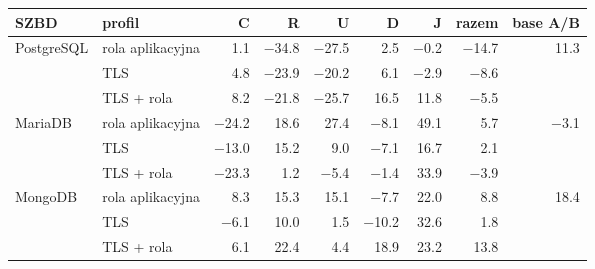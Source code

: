\begin{tabular}{llrrrrrrr}
\toprule
SZBD & profil & C & R & U & D & J & razem & base A/B \\
\midrule
PostgreSQL & rola aplikacyjna & \num[print-implicit-plus]{+1.1} & \num[print-implicit-plus]{-34.8} & \num[print-implicit-plus]{-27.5} & \num[print-implicit-plus]{+2.5} & \num[print-implicit-plus]{-0.2} & \num[print-implicit-plus]{-14.7} & \num[print-implicit-plus]{+11.3} \\
 & TLS & \num[print-implicit-plus]{+4.8} & \num[print-implicit-plus]{-23.9} & \num[print-implicit-plus]{-20.2} & \num[print-implicit-plus]{+6.1} & \num[print-implicit-plus]{-2.9} & \num[print-implicit-plus]{-8.6} & \\
 & TLS + rola & \num[print-implicit-plus]{+8.2} & \num[print-implicit-plus]{-21.8} & \num[print-implicit-plus]{-25.7} & \num[print-implicit-plus]{+16.5} & \num[print-implicit-plus]{+11.8} & \num[print-implicit-plus]{-5.5} & \\
\midrule
MariaDB & rola aplikacyjna & \num[print-implicit-plus]{-24.2} & \num[print-implicit-plus]{+18.6} & \num[print-implicit-plus]{+27.4} & \num[print-implicit-plus]{-8.1} & \num[print-implicit-plus]{+49.1} & \num[print-implicit-plus]{+5.7} & \num[print-implicit-plus]{-3.1} \\
 & TLS & \num[print-implicit-plus]{-13.0} & \num[print-implicit-plus]{+15.2} & \num[print-implicit-plus]{+9.0} & \num[print-implicit-plus]{-7.1} & \num[print-implicit-plus]{+16.7} & \num[print-implicit-plus]{+2.1} & \\
 & TLS + rola & \num[print-implicit-plus]{-23.3} & \num[print-implicit-plus]{+1.2} & \num[print-implicit-plus]{-5.4} & \num[print-implicit-plus]{-1.4} & \num[print-implicit-plus]{+33.9} & \num[print-implicit-plus]{-3.9} & \\
\midrule
MongoDB & rola aplikacyjna & \num[print-implicit-plus]{+8.3} & \num[print-implicit-plus]{+15.3} & \num[print-implicit-plus]{+15.1} & \num[print-implicit-plus]{-7.7} & \num[print-implicit-plus]{+22.0} & \num[print-implicit-plus]{+8.8} & \num[print-implicit-plus]{+18.4} \\
 & TLS & \num[print-implicit-plus]{-6.1} & \num[print-implicit-plus]{+10.0} & \num[print-implicit-plus]{+1.5} & \num[print-implicit-plus]{-10.2} & \num[print-implicit-plus]{+32.6} & \num[print-implicit-plus]{+1.8} & \\
 & TLS + rola & \num[print-implicit-plus]{+6.1} & \num[print-implicit-plus]{+22.4} & \num[print-implicit-plus]{+4.4} & \num[print-implicit-plus]{+18.9} & \num[print-implicit-plus]{+23.2} & \num[print-implicit-plus]{+13.8} & \\

\end{tabular}
